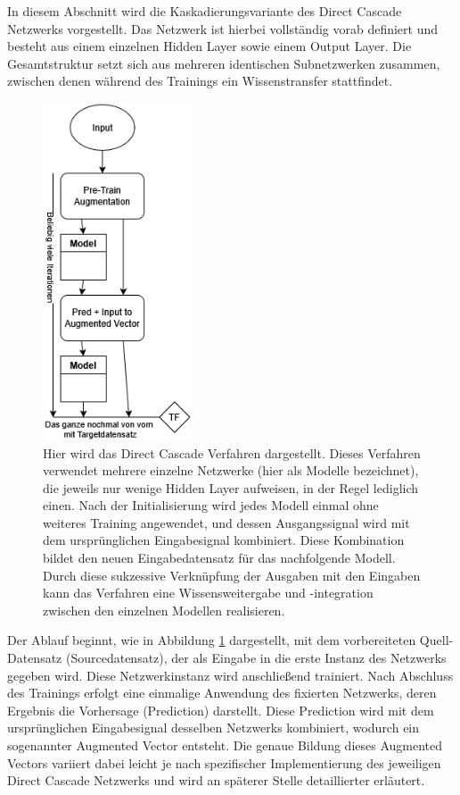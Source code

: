 In diesem Abschnitt wird die Kaskadierungsvariante des Direct Cascade Netzwerks vorgestellt. Das Netzwerk ist hierbei vollständig vorab 
definiert und besteht aus einem einzelnen Hidden Layer sowie einem Output Layer. Die Gesamtstruktur setzt sich aus mehreren identischen 
Subnetzwerken zusammen, zwischen denen während des Trainings ein Wissenstransfer stattfindet.

\begin{figure}[htpb]
    \centering
    \includegraphics[height=10cm]{../../Graphiken/direct_cascade.png}
    \caption{\label{fig:directcascade} 
    \small{Hier wird das Direct Cascade Verfahren dargestellt. Dieses Verfahren verwendet mehrere einzelne Netzwerke 
    (hier als Modelle bezeichnet), die jeweils nur wenige Hidden Layer aufweisen, in der Regel lediglich einen. Nach der 
    Initialisierung wird jedes Modell einmal ohne weiteres Training angewendet, und dessen Ausgangssignal wird mit dem ursprünglichen 
    Eingabesignal kombiniert. Diese Kombination bildet den neuen Eingabedatensatz für das nachfolgende Modell. Durch diese sukzessive 
    Verknüpfung der Ausgaben mit den Eingaben kann das Verfahren eine Wissensweitergabe und -integration zwischen den einzelnen Modellen 
    realisieren.}}
\end{figure}

Der Ablauf beginnt, wie in Abbildung \ref{fig:directcascade} dargestellt, mit dem vorbereiteten Quell-Datensatz (Sourcedatensatz), der als 
Eingabe in die erste Instanz des Netzwerks gegeben wird. Diese Netzwerkinstanz wird anschließend trainiert. Nach Abschluss des Trainings 
erfolgt eine einmalige Anwendung des fixierten Netzwerks, deren Ergebnis die Vorhersage (Prediction) darstellt. Diese Prediction wird mit 
dem ursprünglichen Eingabesignal desselben Netzwerks kombiniert, wodurch ein sogenannter Augmented Vector entsteht. Die genaue Bildung dieses 
Augmented Vectors variiert dabei leicht je nach spezifischer Implementierung des jeweiligen Direct Cascade Netzwerks und wird an späterer 
Stelle detaillierter erläutert.

